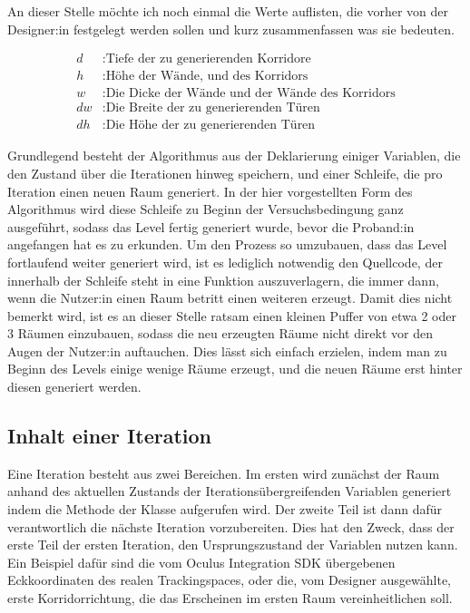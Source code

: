An dieser Stelle möchte ich noch einmal die Werte auflisten, die vorher von der Designer:in festgelegt werden sollen und kurz zusammenfassen was sie bedeuten.

\begin{align*}
    d &: \text{Tiefe der zu generierenden Korridore} \\
    h &: \text{Höhe der Wände, und des Korridors} \\
    w &: \text{Die Dicke der Wände und der Wände des Korridors} \\
    dw &: \text{Die Breite der zu generierenden Türen} \\
    dh &: \text{Die Höhe der zu generierenden Türen}
\end{align*}

Grundlegend besteht der Algorithmus aus der Deklarierung einiger Variablen, die den Zustand über die Iterationen hinweg speichern, und einer Schleife, die pro Iteration einen neuen Raum generiert. In der hier vorgestellten Form des Algorithmus wird diese Schleife zu Beginn der Versuchsbedingung ganz ausgeführt, sodass das Level fertig generiert wurde, bevor die Proband:in angefangen hat es zu erkunden.
Um den Prozess so umzubauen, dass das Level fortlaufend weiter generiert wird, ist es lediglich notwendig den Quellcode, der innerhalb der Schleife steht in eine Funktion auszuverlagern, die immer dann, wenn die Nutzer:in einen Raum betritt einen weiteren erzeugt. Damit dies nicht bemerkt wird, ist es an dieser Stelle ratsam einen kleinen Puffer von etwa 2 oder 3 Räumen einzubauen, sodass die neu erzeugten Räume nicht direkt vor den Augen der Nutzer:in auftauchen. Dies lässt sich einfach erzielen, indem man zu Beginn des Levels einige wenige Räume erzeugt, und die neuen Räume erst hinter diesen generiert werden.

\subsection{Inhalt einer Iteration}\label{subsec:iteration}
Eine Iteration besteht aus zwei Bereichen. Im ersten wird zunächst der Raum anhand des aktuellen Zustands der Iterationsübergreifenden Variablen generiert indem die  Methode der  Klasse aufgerufen wird. Der zweite Teil ist dann dafür verantwortlich die nächste Iteration vorzubereiten. Dies hat den Zweck, dass der erste Teil der ersten Iteration, den Ursprungszustand der Variablen nutzen kann. Ein Beispiel dafür sind die vom Oculus Integration SDK übergebenen Eckkoordinaten des realen Trackingspaces, oder die, vom Designer ausgewählte, erste Korridorrichtung, die das Erscheinen im ersten Raum vereinheitlichen soll.

